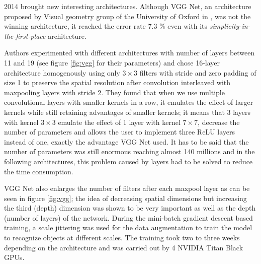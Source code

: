  2014 brought new interesting architectures. Although VGG Net, an 
architecture proposed by Visual geometry group of the University of Oxford in 
\cite{vgg}, was not the winning architecture, it reached the error rate 7.3 \% 
even with its \textit{simplicity-in-the-first-place} architecture.

Authors experimented with different architectures with number of layers between 
11 and 19 (see figure \ref{fig:vgg} for their parameters) and chose 16-layer 
architecture homogenously using only $3 \times 3$ filters with stride and zero 
padding of size 1 to preserve the spatial resolution after convolution 
interleaved with maxpooling layers with stride 2. They found that when we use 
multiple convolutional layers with smaller kernels in a row, it emulates the 
effect of larger kernels while still retaining advantages of smaller kernels; it 
means that 3 layers with kernel $3 \times 3$ emulate the effect of 1 layer with 
kernel $7 \times 7$, decrease the number of parameters and allows the user to 
implement three ReLU layers instead of one, exactly the advantage VGG Net used. 
It has to be said that the number of parameters was still enormous reaching 
almost 140 millions and in the following architectures, this problem caused by 
 layers had to be solved to reduce the time consumption.

VGG Net also enlarges the number of filters after each maxpool layer as can be 
seen in figure \ref{fig:vgg}; the idea of decreasing spatial dimensions but 
increasing the third (depth) dimension was shown to be very important as well as 
the depth (number of layers) of the network. During the mini-batch gradient 
descent based training, a scale jittering was used for the data augmentation to 
train the model to recognize objects at different scales. The training took two 
to three weeks depending on the architecture and was carried out by 4 NVIDIA 
Titan Black GPUs.

